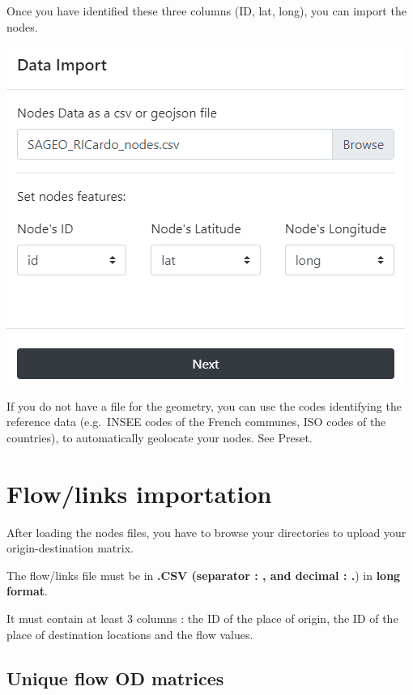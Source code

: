 \documentclass[
  letterpaper,
  DIV=11,
  numbers=noendperiod]{scrreprt}
\begin{document}
Once you have identified these three columns (ID, lat, long), you can
import the nodes.

\begin{center}
\includegraphics{images/Nodes_custom_import.PNG}
\end{center}

If you do not have a file for the geometry, you can use the codes
identifying the reference data (e.g.~INSEE codes of the French communes,
ISO codes of the countries), to automatically geolocate your nodes. See
Preset.

\section{Flow/links importation}\label{flowlinks-importation}

After loading the nodes files, you have to browse your directories to
upload your origin-destination matrix.

The flow/links file must be in \textbf{.CSV (separator : , and decimal :
.}) in \textbf{long format}.

It must contain at least 3 columns : the ID of the place of origin, the
ID of the place of destination locations and the flow values.

\subsection{Unique flow OD matrices}\label{unique-flow-od-matrices}
\end{document}
